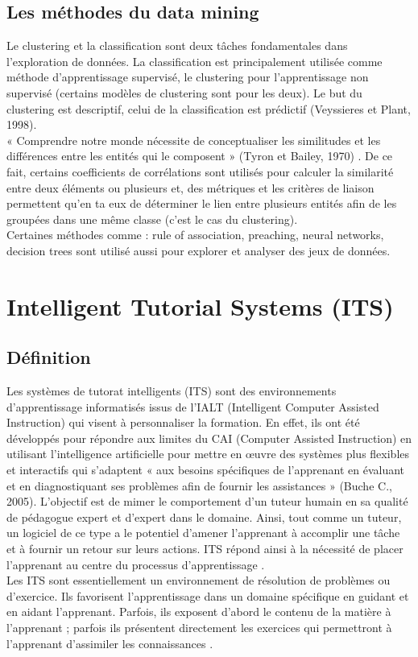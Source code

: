     \subsection{Les méthodes du data mining}
    Le clustering et la classification sont deux tâches fondamentales dans l'exploration de données.
    La classification est principalement utilisée comme méthode d'apprentissage supervisé, le clustering pour 
    l'apprentissage non supervisé (certains modèles de clustering sont pour les deux). Le but du clustering est descriptif, 
    celui de la classification est prédictif (Veyssieres et Plant, 1998). \\
    « Comprendre notre monde nécessite de conceptualiser les similitudes et les différences entre les entités qui 
    le composent » (Tyron et Bailey, 1970) \cite{Educational_data_mining_a_survey_from_1995_to_2005}. De ce fait, certains coefficients de corrélations sont utilisés pour 
    calculer la similarité entre deux éléments ou plusieurs et, des métriques et les critères de liaison permettent 
    qu’en ta eux de déterminer le lien entre plusieurs entités afin de les groupées dans une même classe 
    (c’est le cas du clustering). \\
    Certaines méthodes comme : rule of association, preaching, neural networks, decision trees sont utilisé aussi pour 
    explorer et analyser des jeux de données.

    \section{Intelligent Tutorial Systems (ITS)}

    \subsection{Définition}
    Les systèmes de tutorat intelligents (ITS) sont des environnements d'apprentissage informatisés issus de l'IALT 
    (Intelligent Computer Assisted Instruction) qui visent à personnaliser la formation. En effet, ils ont été développés 
    pour répondre aux limites du CAI (Computer Assisted Instruction) en utilisant l'intelligence artificielle pour mettre 
    en œuvre des systèmes plus flexibles et interactifs qui s'adaptent « aux besoins spécifiques de l'apprenant en évaluant 
    et en diagnostiquant ses problèmes afin de fournir les assistances » (Buche C., 2005). L'objectif est de mimer le 
    comportement d'un tuteur humain en sa qualité de pédagogue expert et d'expert dans le domaine. Ainsi, tout comme 
    un tuteur, un logiciel de ce type a le potentiel d'amener l'apprenant à accomplir une tâche et à fournir un retour 
    sur leurs actions. ITS répond ainsi à la nécessité de placer l'apprenant au centre du processus d'apprentissage \cite{buche:tel-00011223}. \\
    Les ITS sont essentiellement un environnement de résolution de problèmes ou d'exercice. Ils favorisent l'apprentissage 
    dans un domaine spécifique en guidant et en aidant l'apprenant. Parfois, ils exposent d'abord le contenu de la matière 
    à l’apprenant ; parfois ils présentent directement les exercices qui permettront à l'apprenant d'assimiler les 
    connaissances \cite{handbook_of_educational_data_mining}.


